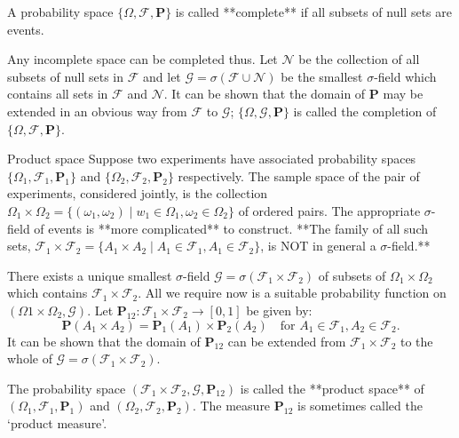\begin{definition}
A probability space $\{\Omega, \mathcal{F}, \mathbf{P}\}$ is called **complete** if all subsets of null sets are events. 
\end{definition}

Any incomplete space can be completed thus. Let $\mathcal{N}$ be the collection of all subsets of null sets in $\mathcal{F}$ and let $\mathcal{G} = \sigma (\mathcal{F} \cup \mathcal{N})$ be the smallest $\sigma$-field which contains all sets in $\mathcal{F}$ 
and $\mathcal{N}$. It can be shown that the domain of $\mathbf{P}$ may be extended in an obvious way from $\mathcal{F}$ to $\mathcal{G}$; $\{\Omega, \mathcal{G}, \mathbf{P}\}$ is called the completion of $\{\Omega, \mathcal{F}, \mathbf{P}\}$. 

\begin{newnotion}{Product space}
Suppose two experiments have associated probability spaces $\{ \Omega_1, \mathcal{F}_1, \mathbf{P}_1 \}$ and  $\{ \Omega_2, \mathcal{F}_2, \mathbf{P}_2 \}$ respectively. The sample space of the pair of experiments, considered jointly, is the collection $\Omega_1 \times \Omega_2 = \{ (\omega_1 , \omega_2) \;\vert\; w_1 \in \Omega_1, \omega_2 \in \Omega_2 \}$ of ordered pairs. The appropriate $\sigma$-field of events is **more complicated** to construct. **The family of all such sets, $\mathcal{F}_1 \times \mathcal{F}_2 = \{A_1 \times A_2 \;\vert\; A_1 \in \mathcal{F}_1 , A_1 \in \mathcal{F}_2 \}$, is NOT in general a $\sigma$-field.**
\end{newnotion}

\begin{remark}
There exists a unique smallest $\sigma$-field $\mathcal{G} = \sigma(\mathcal{F}_1 \times \mathcal{F}_2)$ of subsets of $\Omega_1 \times \Omega_2$ which contains $\mathcal{F}_1 \times \mathcal{F}_2$. All we require now is a suitable probability function on $( \Omega1 \times \Omega_2, \mathcal{G} )$. Let $\mathbf{P}_{12}: \mathcal{F}_1 \times \mathcal{F}_2 \to [0, 1]$ be given by: 
\begin{equation*}
    \mathbf{P}(A_1 \times A_2) = \mathbf{P}_1(A_1) \times \mathbf{P}_2(A_2) \quad \text{for $A_1 \in \mathcal{F}_1, A_2 \in \mathcal{F}_2$}.
\end{equation*}
It can be shown that the domain of $\mathbf{P}_{12}$ can be extended from $\mathcal{F}_1 \times \mathcal{F}_2$ to the whole of $\mathcal{G} = \sigma(\mathcal{F}_1 \times \mathcal{F}_2)$.
\end{remark}

\begin{definition}
The probability space $(\mathcal{F}_1 \times \mathcal{F}_2, \mathcal{G}, \mathbf{P}_{12})$ is called the **product space** of $(\Omega_1, \mathcal{F}_1, \mathbf{P}_1)$ and  $(\Omega_2, \mathcal{F}_2, \mathbf{P}_2)$. The measure $\mathbf{P}_{12}$ is sometimes called the `product measure'. 
\end{definition}



